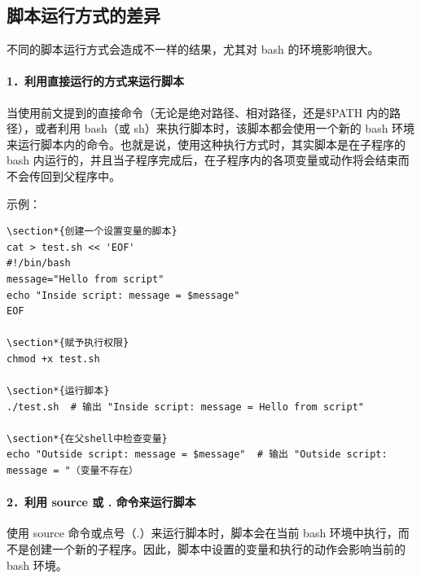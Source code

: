 \documentclass[12pt,UTF8]{ctexbook}
\begin{document}
\subsection{脚本运行方式的差异}
不同的脚本运行方式会造成不一样的结果，尤其对 bash 的环境影响很大。

\paragraph{1．利用直接运行的方式来运行脚本}
当使用前文提到的直接命令（无论是绝对路径、相对路径，还是\$PATH 内的路径），或者利用 bash（或 sh）来执行脚本时，该脚本都会使用一个新的 bash 环境来运行脚本内的命令。也就是说，使用这种执行方式时，其实脚本是在子程序的 bash 内运行的，并且当子程序完成后，在子程序内的各项变量或动作将会结束而不会传回到父程序中。

示例：
\begin{verbatim}
\section*{创建一个设置变量的脚本}
cat > test.sh << 'EOF'
#!/bin/bash
message="Hello from script"
echo "Inside script: message = $message"
EOF

\section*{赋予执行权限}
chmod +x test.sh

\section*{运行脚本}
./test.sh  # 输出 "Inside script: message = Hello from script"

\section*{在父shell中检查变量}
echo "Outside script: message = $message"  # 输出 "Outside script: message = "（变量不存在）
\end{verbatim}

\paragraph{2．利用 source 或 . 命令来运行脚本}
使用 source 命令或点号（.）来运行脚本时，脚本会在当前 bash 环境中执行，而不是创建一个新的子程序。因此，脚本中设置的变量和执行的动作会影响当前的 bash 环境。
\end{document}
